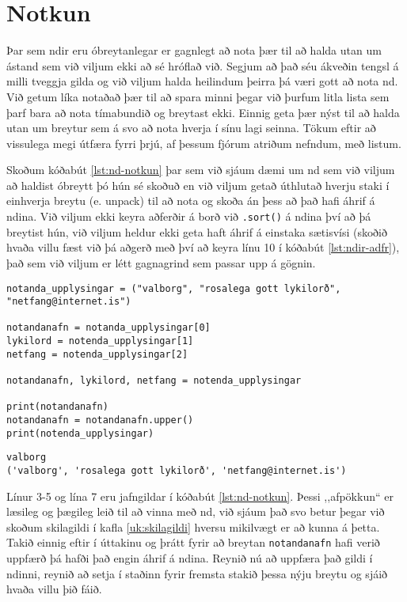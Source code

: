 \section{Notkun}
Þar sem ndir eru óbreytanlegar er gagnlegt að nota þær til að halda utan um ástand sem við viljum ekki að sé hróflað við.
Segjum að það séu ákveðin tengsl á milli tveggja gilda og við viljum halda heilindum þeirra þá væri gott að nota nd.
Við getum líka notaðað þær til að spara minni þegar við þurfum litla lista sem þarf bara að nota tímabundið og breytast ekki.
Einnig geta þær nýst til að halda utan um breytur sem á svo að nota hverja í sínu lagi seinna.
Tökum eftir að vissulega megi útfæra fyrri þrjú, af þessum fjórum atriðum nefndum, með listum.

Skoðum kóðabút \ref{lst:nd-notkun} þar sem við sjáum dæmi um nd sem við viljum að haldist óbreytt þó hún sé skoðuð en við viljum getað úthlutað hverju staki í einhverja breytu (e. unpack) til að nota og skoða án þess að það hafi áhrif á ndina.
Við viljum ekki keyra aðferðir á borð við \texttt{.sort()} á ndina því að þá breytist hún, við viljum heldur ekki geta haft áhrif á einstaka sætisvísi (skoðið hvaða villu fæst við þá aðgerð með því að keyra línu 10 í kóðabút \ref{lst:ndir-adfr}), það sem við viljum er létt gagnagrind sem passar upp á gögnin.




\begin{lstlisting}[caption=Ndir notaðar fyrir það sem þær eru gagnlegar, label=lst:nd-notkun]
notanda_upplysingar = ("valborg", "rosalega gott lykilorð", "netfang@internet.is")

notandanafn = notanda_upplysingar[0]
lykilord = notenda_upplysingar[1]
netfang = notenda_upplysingar[2]

notandanafn, lykilord, netfang = notenda_upplysingar

print(notandanafn)
notandanafn = notandanafn.upper()
print(notenda_upplysingar)
\end{lstlisting}
\lstset{style=uttak}
\begin{lstlisting}
valborg
('valborg', 'rosalega gott lykilorð', 'netfang@internet.is')
\end{lstlisting}
\lstset{style=venjulegt}

Línur 3-5 og lína 7 eru jafngildar í kóðabút \ref{lst:nd-notkun}.
Þessi ,,afpökkun“ er læsileg og þægileg leið til að vinna með nd, við sjáum það svo betur þegar við skoðum skilagildi í kafla \ref{uk:skilagildi} hversu mikilvægt er að kunna á þetta.
Takið einnig eftir í úttakinu og þrátt fyrir að breytan \texttt{notandanafn} hafi verið uppfærð þá hafði það engin áhrif á ndina.
Reynið nú að uppfæra það gildi í ndinni, reynið að setja í staðinn fyrir fremsta stakið þessa nýju breytu og sjáið hvaða villu þið fáið.

